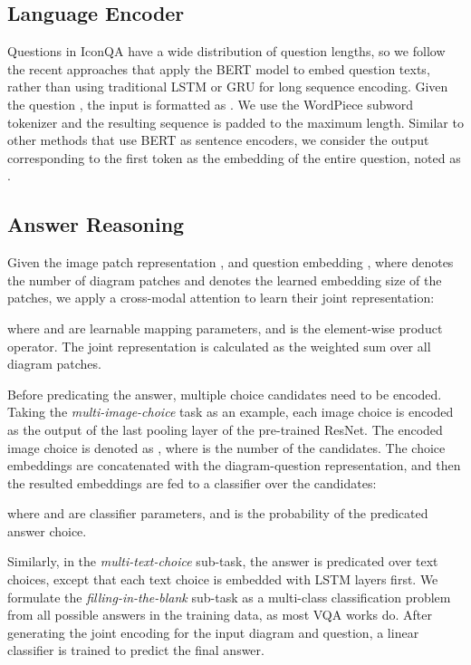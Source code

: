 \documentclass{article}
\begin{document}
\subsection{Language Encoder}
Questions in IconQA have a wide distribution of question lengths, so we follow the recent approaches \cite{vaswani2017attention,jiao2019tinybert,turc2019well,li2019visualbert, lu2019vilbert} that apply the BERT model \cite{devlin2018bert} to embed question texts, rather than using traditional LSTM \cite{hochreiter1997long} or GRU \cite{cho2014learning} for long sequence encoding. Given the question , the input is formatted as . We use the WordPiece \cite{schuster2012japanese} subword tokenizer and the resulting sequence is padded to the maximum length. Similar to other methods that use BERT as sentence encoders, we consider the output corresponding to the first token  as the embedding of the entire question, noted as .

\subsection{Answer Reasoning}
Given the image patch representation , and question embedding , where  denotes the number of diagram patches and  denotes the learned embedding size of the patches, we apply a cross-modal attention to learn their joint representation:

where  and  are learnable mapping parameters, and  is the element-wise product operator. The joint representation  is calculated as the weighted sum over all diagram patches.

Before predicating the answer, multiple choice candidates need to be encoded. Taking the \textit{multi-image-choice} task as an example, each image choice is encoded as the output of the last pooling layer of the pre-trained ResNet. The encoded image choice is denoted as , where  is the number of the candidates. The choice embeddings are concatenated with the diagram-question representation, and then the resulted embeddings are fed to a classifier over the candidates:

where  and  are classifier parameters, and  is the probability of the predicated answer choice. 

Similarly, in the \textit{multi-text-choice} sub-task, the answer is predicated over text choices, except that each text choice is embedded with LSTM layers first. 
We formulate the \textit{filling-in-the-blank} sub-task as a multi-class classification problem from all possible answers in the training data, as most VQA works do. After generating the joint encoding for the input diagram and question, a linear classifier is trained to predict the final answer.
\end{document}
